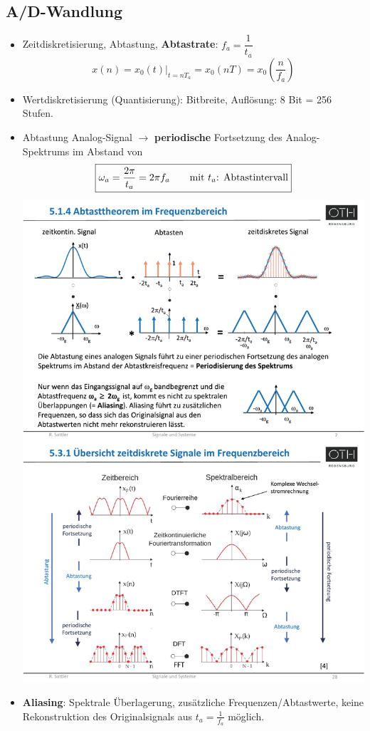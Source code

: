 \begin{multicols*}{2}
\subsection{A/D-Wandlung}
\small
\begin{itemize}
	\item Zeitdiskretisierung, Abtastung, \textbf{Abtastrate}: $\boxed{f_a = \dfrac{1}{t_a}}$
	\[
	x(n)= x_0(t)\big|_{t = n{T_a}} = x_0 (nT) = x_0\left(\frac{n}{f_a}\right)
	\]
	\item Wertdiskretisierung (Quantisierung): Bitbreite, Aufl\"osung: 8 Bit = 256 Stufen.
	\item Abtastung Analog-Signal $\rightarrow$ \textbf{periodische} Fortsetzung des Analog-Spektrums im Abstand von $$ \boxed{
	\omega_a=\frac{2\pi}{t_a}=2\pi f_a \text{\qquad mit } t_a\text{: Abtastintervall} }$$
	\includegraphics[width=0.9\columnwidth]{Bilder/Abtastung_Frequenzbereich_Spektrum_Original}
	\item \textbf{Aliasing}: {\small Spektrale \"Uberlagerung, zus\"atzliche Frequenzen/Abtastwerte, keine Rekonstruktion des Originalsignals aus $t_a=\frac{1}{f_a}$ m\"oglich.\\
				
}
\end{itemize}
\end{multicols*}
